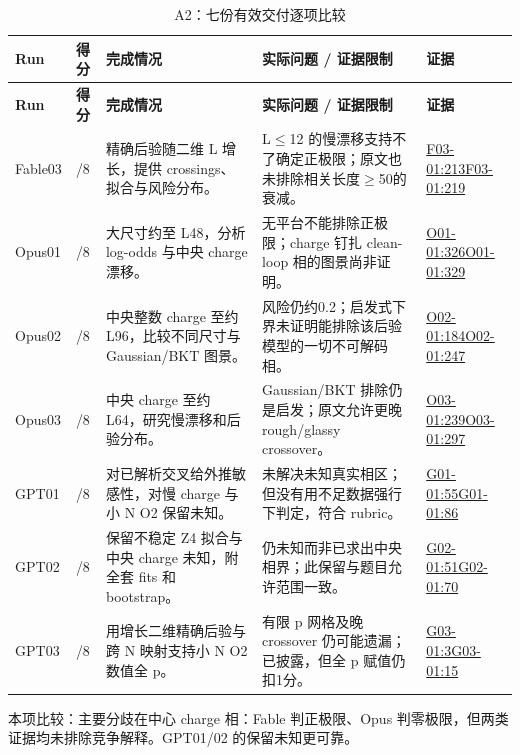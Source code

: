 \documentclass[11pt,a4paper]{article}
\begin{document}
{\fontsize{9.0}{12.6}\selectfont
\setlength{\tabcolsep}{2.5pt}
\begin{longtable}{>{\raggedright\arraybackslash}p{}>{\raggedright\arraybackslash}p{}>{\raggedright\arraybackslash}p{}>{\raggedright\arraybackslash}p{}>{\raggedright\arraybackslash}p{}}
\caption{A2：七份有效交付逐项比较}\\
\toprule
\textbf{Run} & \textbf{得分} & \textbf{完成情况} & \textbf{实际问题 / 证据限制} & \textbf{证据}\tabularnewline
\midrule
\endfirsthead
\toprule
\textbf{Run} & \textbf{得分} & \textbf{完成情况} & \textbf{实际问题 / 证据限制} & \textbf{证据}\tabularnewline
\midrule
\endhead
{}Fable03 & 4/8 & 精确后验随二维 L 增长，提供 crossings、拟合与风险分布。 & L\ensuremath{\leq}12 的慢漂移支持不了确定正极限；原文也未排除相关长度\ensuremath{\geq}50的衰减。 & \hyperref[src:F03-01]{F03-01:213}\newline \hyperref[src:F03-01]{F03-01:219}\tabularnewline
{}Opus01 & 5/8 & 大尺寸约至 L48，分析 log-odds 与中央 charge 漂移。 & 无平台不能排除正极限；charge 钉扎 clean-loop 相的图景尚非证明。 & \hyperref[src:O01-01]{O01-01:326}\newline \hyperref[src:O01-01]{O01-01:329}\tabularnewline
{}Opus02 & 5/8 & 中央整数 charge 至约 L96，比较不同尺寸与 Gaussian/BKT 图景。 & 风险仍约0.2；启发式下界未证明能排除该后验模型的一切不可解码相。 & \hyperref[src:O02-01]{O02-01:184}\newline \hyperref[src:O02-01]{O02-01:247}\tabularnewline
{}Opus03 & 5/8 & 中央 charge 至约 L64，研究慢漂移和后验分布。 & Gaussian/BKT 排除仍是启发；原文允许更晚 rough/glassy crossover。 & \hyperref[src:O03-01]{O03-01:239}\newline \hyperref[src:O03-01]{O03-01:297}\tabularnewline
{}GPT01 & 8/8 & 对已解析交叉给外推敏感性，对慢 charge 与小 N O2 保留未知。 & 未解决未知真实相区；但没有用不足数据强行下判定，符合 rubric。 & \hyperref[src:G01-01]{G01-01:55}\newline \hyperref[src:G01-01]{G01-01:86}\tabularnewline
{}GPT02 & 8/8 & 保留不稳定 Z4 拟合与中央 charge 未知，附全套 fits 和 bootstrap。 & 仍未知而非已求出中央相界；此保留与题目允许范围一致。 & \hyperref[src:G02-01]{G02-01:51}\newline \hyperref[src:G02-01]{G02-01:70}\tabularnewline
{}GPT03 & 7/8 & 用增长二维精确后验与跨 N 映射支持小 N O2 数值全 p。 & 有限 p 网格及晚 crossover 仍可能遗漏；已披露，但全 p 赋值仍扣1分。 & \hyperref[src:G03-01]{G03-01:3}\newline \hyperref[src:G03-01]{G03-01:15}\tabularnewline
\bottomrule
\end{longtable}
}
本项比较：主要分歧在中心 charge 相：Fable 判正极限、Opus 判零极限，但两类证据均未排除竞争解释。GPT01/02 的保留未知更可靠。
\end{document}

